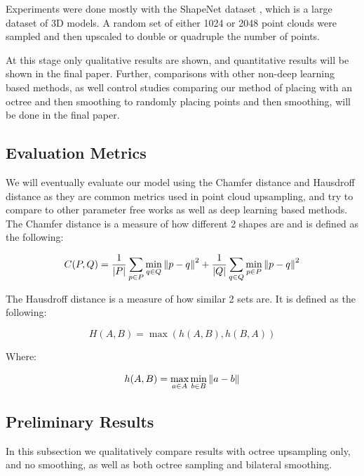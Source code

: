 Experiments were done mostly with the ShapeNet dataset \cite{shapenet}, which is a large dataset of 3D models. A random set of either 1024 or 2048 point clouds were sampled and then upscaled to double or quadruple the number of points.

At this stage only qualitative results are shown, and quantitative results will be shown in the final paper. 
Further, comparisons with other non-deep learning based methods, as well control studies comparing our method of placing with an octree and then smoothing to randomly placing points and then smoothing, will be done in the final paper.

\subsection{Evaluation Metrics}

We will eventually evaluate our model using the Chamfer distance and Hausdroff distance as they are common metrics used in point cloud upsampling, and try to compare to other parameter free works as well as deep learning based methods.
The Chamfer distance is a measure of how different 2 shapes are and is defined as the following:

$$ C(P, Q) = \dfrac{1}{|P|} \sum\limits_{p \in P} \min_{q \in Q} \left\lVert p - q\right\rVert^2 +  \dfrac{1}{|Q|} \sum\limits_{q \in Q} \min_{p \in P} \left\lVert p - q\right\rVert^2 \label{eq:chamfer}$$

The Hausdroff distance is a measure of how similar 2 sets are. It is defined as the following:

$$ H(A, B) = \max(h(A, B), h(B, A))\label{eq:hausdroff}$$

Where:

$$h(A, B) = \max_{a \in A} \min_{b \in B} \left\lVert a - b\right\rVert$$

\subsection{Preliminary Results}

In this subsection we qualitatively compare results with octree upsampling only, and no smoothing, as well as both octree sampling and bilateral smoothing.

